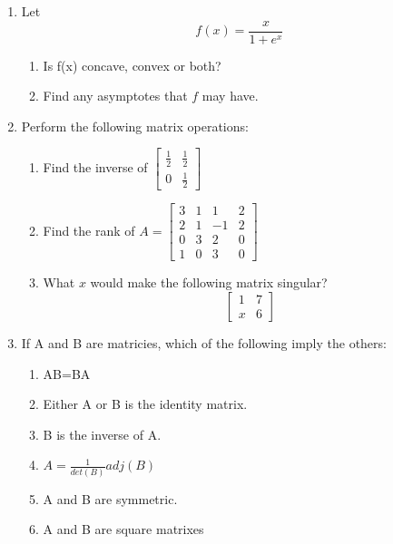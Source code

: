 \documentclass[11pt]{article}
\begin{document}
\begin{enumerate}
\bigskip
\bigskip
\bigskip
\bigskip
\bigskip
\bigskip
\bigskip
\bigskip
\bigskip
\bigskip

\vspace{.2in}
\item Let $$f(x)=\frac{x}{1+e^x}$$
\begin{enumerate}
\item Is f(x) concave, convex or both?
\bigskip
\bigskip
\bigskip
\bigskip
\bigskip
\bigskip
\bigskip
\bigskip
\bigskip
\bigskip

\item Find any asymptotes that $f$ may have.
\bigskip
\bigskip
\bigskip
\bigskip
\bigskip
\bigskip
\bigskip
\bigskip
\bigskip
\bigskip
\end{enumerate}

\item Perform the following matrix operations:

\begin{enumerate}
\item Find the inverse of $\begin{bmatrix}\frac{1}{2} & \frac{1}{2}\\ 0& \frac{1}{2}
\end{bmatrix}$

\pagebreak

\item Find the rank of 
$A=\begin{bmatrix} 
3& 1& 1&2\\
2& 1& -1&2\\
0& 3& 2&0\\
1& 0& 3&0
\end{bmatrix}$
\bigskip
\bigskip
\bigskip
\bigskip


\item What $x$ would make the following matrix singular?
$$\begin{bmatrix}
1&7\\ x&6
\end{bmatrix}$$
\end{enumerate}
\bigskip
\bigskip
\bigskip
\bigskip
\vspace{.2in}

\item If A and B are matricies, which of the following imply the others: 
\begin{enumerate}
\item AB=BA
\item Either A or B is the identity matrix.
\item B is the inverse of A.
\item $A=\frac{1}{det(B)}adj(B)$
\item A and B are symmetric.
\item A and B are square matrixes
\end{enumerate}


\end{enumerate}
\end{document}

